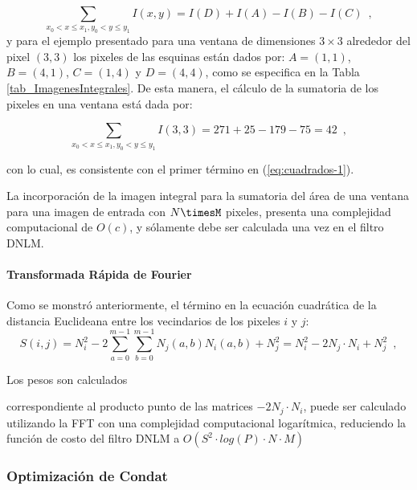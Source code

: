 \begin{equation}
\sum_{x_{0}<x\leq x_{1},y_{0}<y\leq y_{1}}I\left(x,y\right)=I\left(D\right)+I\left(A\right)-I\left(B\right)-I\left(C\right) \enspace ,
\end{equation}
y para el ejemplo presentado para una ventana de dimensiones $3\times3$ alrededor del pixel $(3,3)$ los pixeles de las esquinas est\'an dados por: $A=\left(1,1\right)$, $B=\left(4,1\right)$,
$C=\left(1,4\right)$ y $D=\left(4,4\right)$, como se especifica en la Tabla \ref{tab_ImagenesIntegrales}. De esta manera, el c\'alculo de la sumatoria de los pixeles en una ventana est\'a dada por: 

\begin{equation}
\sum_{x_{0}<x\leq x_{1},y_{0}<y\leq y_{1}}I\left(3,3\right)=271+25-179-75=42 \enspace ,
\end{equation}

con lo cual, es consistente con el primer t\'ermino en (\ref{eq:cuadrados-1}). 

La incorporaci\'on de la imagen integral para la sumatoria del \'area de una ventana para una imagen de entrada con $N\timesM$ pixeles, presenta una complejidad computacional de $O(c)$, y s\'olamente debe ser calculada una vez en el filtro DNLM.


\paragraph{Transformada R\'apida de Fourier}

Como se monstr\'o anteriormente, el t\'ermino en la ecuaci\'on cuadr\'atica de la distancia Euclideana entre los vecindarios de los pixeles $i$ y $j$:
\begin{equation}
S\left(i,j\right)=N_{i}^{2}-2\sum_{a=0}^{m-1}\sum_{b=0}^{m-1}N_{j}\left(a,b\right)N_{i}\left(a,b\right)+N_{j}^{2} =N_{i}^{2}-2N_{j}\cdot N_{i}+N_{j}^{2} \enspace , 
\end{equation}


Los pesos son calculados



correspondiente al producto punto de las matrices $-2N_{j}\cdot N_{i}$,  puede ser calculado utilizando la FFT con una complejidad computacional logar\'itmica, reduciendo la funci\'on de costo del filtro DNLM a $O(S^2 \cdot log(P) \cdot N \cdot M)$



\subsubsection{Optimizaci\'on de Condat}
\label{ch:marco_condat}

